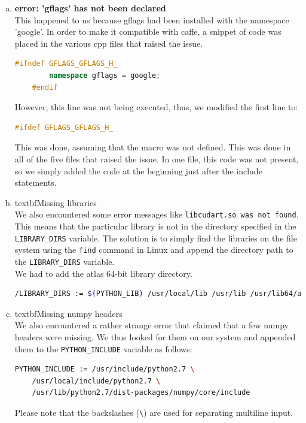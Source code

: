 \documentclass{article}
\begin{document}
\begin{enumerate}[a)]
	\item \textbf{error: 'gflags' has not been declared}\\
	This happened to us because gflags had been installed with the namespace 'google'. In order to make it compatible with caffe, a snippet of code was placed in the various cpp files that raised the issue.
	\begin{lstlisting}[language=c++,breaklines]
	#ifndef GFLAGS_GFLAGS_H_
		namespace gflags = google;
	#endif
	\end{lstlisting}
	
	However, this line was not being executed, thus, we modified the first line to:
	\begin{lstlisting}[language=c++,breaklines]
	#ifdef GFLAGS_GFLAGS_H_
	\end{lstlisting}
	This was done, assuming that the macro was not defined. This was done in all of the five files that raised the issue. In one file, this code was not present, so we simply added the code at the beginning just after the include statements.
	
	\item textbf{Missing libraries}\\
	We also encountered some error messages like \texttt{libcudart.so was not found}. This means that the particular library is not in the directory specified in the \verb|LIBRARY_DIRS| variable. The solution is to simply find the libraries on the file system using the \verb|find| command in Linux and append the directory path to the \verb|LIBRARY_DIRS| variable.\\
	We had to add the atlas 64-bit library directory.
	\begin{lstlisting}[tabsize=4,language=bash,breaklines]
	/LIBRARY_DIRS := $(PYTHON_LIB) /usr/local/lib /usr/lib /usr/lib64/atlas$
	\end{lstlisting}
	
	\item textbf{Missing numpy headers}\\
	We also encountered a rather strange error that claimed that a few numpy headers were missing. We thus looked for them on our system and appended them to the \verb|PYTHON_INCLUDE| variable as follows:
	\begin{lstlisting}[tabsize=4,language=bash,breaklines]
	PYTHON_INCLUDE := /usr/include/python2.7 \
	/usr/local/include/python2.7 \
	/usr/lib/python2.7/dist-packages/numpy/core/include
	\end{lstlisting}
	Please note that the backslashes (\verb|\|) are used for separating multiline input.
\end{enumerate}
\end{document}

